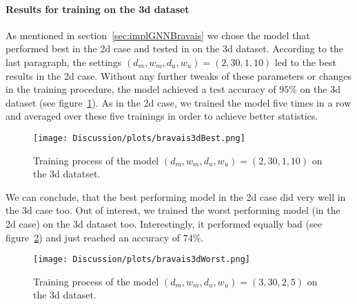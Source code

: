 \paragraph{Results for training on the 3d dataset}
As mentioned in section~\ref{sec:implGNNBravais} we chose the model that 
performed best in the 2d case and tested in on the 3d dataset. 
According to the last paragraph, the settings $(d_m,w_m,d_u,w_u)=(2, 30, 1, 10)$ led to the best results 
in the 2d case. Without any further tweaks of these parameters or changes in the training procedure,
the model achieved a test accuracy of $95\%$ on the 3d dataset (see figure~\ref{fig:bravaisBest3d}). 
As in the 2d case, we trained the model five times in a row and averaged over these five trainings in order to achieve better statistics.
\begin{figure}[h]
    \centering
    \texttt{[image: Discussion/plots/bravais3dBest.png]}
    \caption{Training process of the model $(d_m,w_m,d_u,w_u)=(2, 30, 1, 10)$ on the 3d datatset.}
    \label{fig:bravaisBest3d}
\end{figure}
We can conclude, that the best performing model in the 2d case did very well in the 3d case too.
Out of interest, we trained the worst performing model (in the 2d case) on the 3d dataset too.
Interestingly, it performed equally bad (see figure~\ref{fig:bravaisWorst3d}) and just reached an accuracy of $74\%$.
\begin{figure}[h]
    \centering
    \texttt{[image: Discussion/plots/bravais3dWorst.png]}
    \caption{Training process of the model $(d_m,w_m,d_u,w_u)=(3, 30, 2, 5)$ on the 3d dataset.}
    \label{fig:bravaisWorst3d}
\end{figure}
